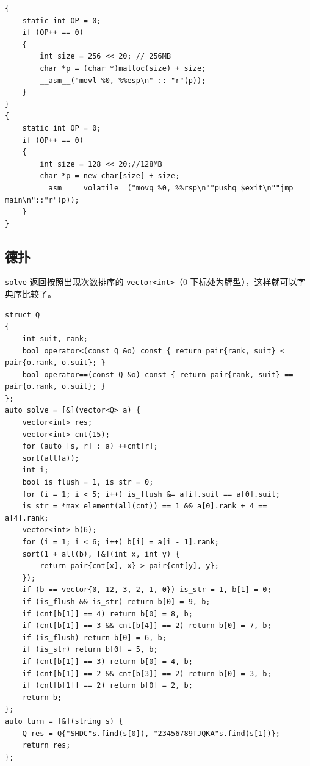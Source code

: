 \documentclass[12pt]{ctexart}
\begin{document}
\begin{lstlisting}
{
	static int OP = 0;
	if (OP++ == 0)
	{
		int size = 256 << 20; // 256MB
		char *p = (char *)malloc(size) + size;
		__asm__("movl %0, %%esp\n" :: "r"(p));
	}
}
{
	static int OP = 0;
	if (OP++ == 0)
	{
		int size = 128 << 20;//128MB
		char *p = new char[size] + size;
		__asm__ __volatile__("movq %0, %%rsp\n""pushq $exit\n""jmp main\n"::"r"(p));
	}
}

\end{lstlisting}

\subsection{德扑}

\verb|solve| 返回按照出现次数排序的 \verb|vector<int>|（$0$ 下标处为牌型），这样就可以字典序比较了。

\begin{lstlisting}
struct Q
{
	int suit, rank;
	bool operator<(const Q &o) const { return pair{rank, suit} < pair{o.rank, o.suit}; }
	bool operator==(const Q &o) const { return pair{rank, suit} == pair{o.rank, o.suit}; }
};
auto solve = [&](vector<Q> a) {
	vector<int> res;
	vector<int> cnt(15);
	for (auto [s, r] : a) ++cnt[r];
	sort(all(a));
	int i;
	bool is_flush = 1, is_str = 0;
	for (i = 1; i < 5; i++) is_flush &= a[i].suit == a[0].suit;
	is_str = *max_element(all(cnt)) == 1 && a[0].rank + 4 == a[4].rank;
	vector<int> b(6);
	for (i = 1; i < 6; i++) b[i] = a[i - 1].rank;
	sort(1 + all(b), [&](int x, int y) {
		return pair{cnt[x], x} > pair{cnt[y], y};
	});
	if (b == vector{0, 12, 3, 2, 1, 0}) is_str = 1, b[1] = 0;
	if (is_flush && is_str) return b[0] = 9, b;
	if (cnt[b[1]] == 4) return b[0] = 8, b;
	if (cnt[b[1]] == 3 && cnt[b[4]] == 2) return b[0] = 7, b;
	if (is_flush) return b[0] = 6, b;
	if (is_str) return b[0] = 5, b;
	if (cnt[b[1]] == 3) return b[0] = 4, b;
	if (cnt[b[1]] == 2 && cnt[b[3]] == 2) return b[0] = 3, b;
	if (cnt[b[1]] == 2) return b[0] = 2, b;
	return b;
};
auto turn = [&](string s) {
	Q res = Q{"SHDC"s.find(s[0]), "23456789TJQKA"s.find(s[1])};
	return res;
};

\end{lstlisting}
\end{document}
